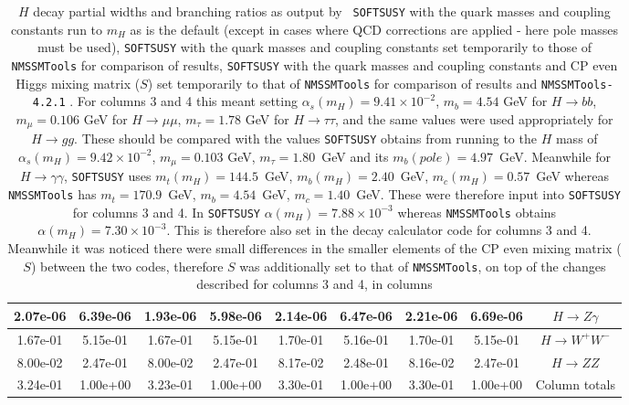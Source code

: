 \documentclass[final,3p,times,pdflatex]{elsarticle}
\begin{document}
\begin{center}
\begin{table}
\begin{tabular}{|c|c|c|c|c|c|c|c|c|}
2.07e-06 & 6.39e-06 & 1.93e-06 & 5.98e-06 & 2.14e-06 & 6.47e-06 & 2.21e-06 & 6.69e-06 & $H \rightarrow Z \gamma$ \\ \hline
1.67e-01 & 5.15e-01 & 1.67e-01 & 5.15e-01 & 1.70e-01 & 5.16e-01 & 1.70e-01 & 5.15e-01 & $H \rightarrow W^+ W^-$ \\ \hline
8.00e-02 & 2.47e-01 & 8.00e-02 & 2.47e-01 & 8.17e-02 & 2.48e-01 & 8.16e-02 & 2.47e-01 & $H \rightarrow Z Z$ \\ \hline
3.24e-01 & 1.00e+00 & 3.23e-01 & 1.00e+00 & 3.30e-01 & 1.00e+00 & 3.30e-01 & 1.00e+00 & Column totals \\ \hline
\end{tabular}
\caption{$H$ decay partial widths and branching ratios as output by {\tt
    SOFTSUSY} with the quark masses and coupling constants run to $m_{H}$
  as is the default (except in cases where QCD corrections are applied - here pole masses
  must be used), {\tt SOFTSUSY} with the quark masses and coupling
  constants set temporarily to those of {\tt NMSSMTools} for comparison of
  results, {\tt SOFTSUSY} with the quark masses and coupling
  constants and CP even Higgs mixing matrix ($S$) set temporarily to that
  of {\tt NMSSMTools} for comparison of
  results and {\tt NMSSMTools-4.2.1}
  \cite{Ellwanger:2004xm,Ellwanger:2012dd,Ellwanger:2006ch}. For columns 3 and
  4 this  
  meant setting $\alpha_s(m_{H})= 9.41\times10^{-2}$, $m_b = 4.54$ GeV for
  $H  
  \rightarrow 
  bb$, $m_{\mu}= 0.106$ GeV for $H \rightarrow \mu \mu$, $m_{\tau}=
  1.78$ GeV for $H 
  \rightarrow  
  \tau \tau$, and the same values were used appropriately for $H 
  \rightarrow gg$. These should be compared with the values {\tt SOFTSUSY}
  obtains from 
  running to the $H$ mass of $\alpha_s(m_{H}) = 9.42\times 10^{-2}$,
  $m_{\mu} = 0.103$ GeV, $m_{\tau} = 1.80$~GeV and its $m_b(pole) = 4.97$~GeV. Meanwhile for $H \rightarrow \gamma \gamma$, {\tt SOFTSUSY}
  uses $m_t(m_{H}) = 144.5$~GeV, $m_{b}(m_{H}) = 2.40$~GeV, $m_c(m_{H}) =
  0.57$~GeV whereas {\tt NMSSMTools}
  has $m_t = 170.9$~GeV, $m_b = 4.54$~GeV, $m_c = 1.40$~GeV. These were
  therefore input into {\tt SOFTSUSY}  
  for columns 3 and 4. In {\tt SOFTSUSY} 
  $\alpha(m_{H}) = 7.88\times10^{-3}$ whereas {\tt NMSSMTools} obtains
  $\alpha(m_{H}) = 7.30\times10^{-3}$. This 
  is therefore also set in the decay calculator code for columns 3 and 4. Meanwhile it was noticed there were small
  differences in the smaller elements of the CP even mixing matrix ($S$) between the two codes, therefore $S$ 
  was additionally set to that of {\tt NMSSMTools}, on top of the changes described for columns 3 and 4, in columns
}
\end{table}
\end{center}
\end{document}
